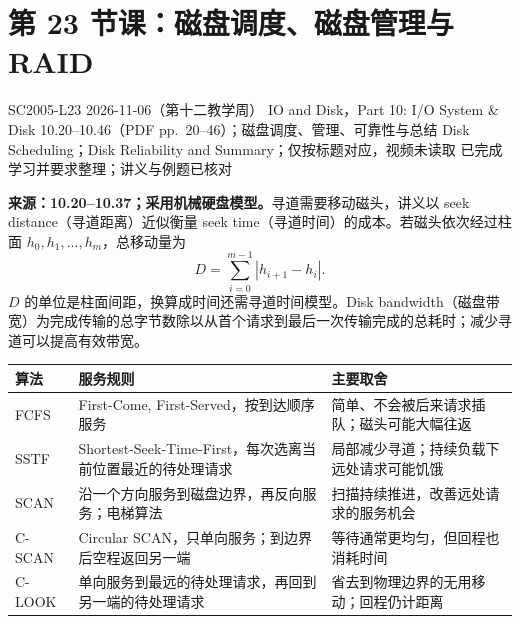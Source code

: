 \begingroup
\renewcommand{\recordid}[1]{}
\renewcommand{\relatedexercise}[2]{\hyperref[exercise:#1]{#2}}
\section{第 23 节课：磁盘调度、磁盘管理与 RAID}
\label{lecture:SC2005-L23}

\lecturemeta
  {SC2005-L23}
  {2026-11-06（第十二教学周）}
  {IO and Disk，Part 10: I/O System \& Disk}
  {10.20--10.46（PDF pp.~20--46）；磁盘调度、管理、可靠性与总结}
  {Disk Scheduling；Disk Reliability and Summary；仅按标题对应，视频未读取}
  {已完成学习并要求整理；讲义与例题已核对}

\linespread{1.1}\selectfont
\setlength{\parskip}{0.3em}



\textbf{来源：10.20--10.37；采用机械硬盘模型。}寻道需要移动磁头，讲义以 seek distance（寻道距离）近似衡量 seek time（寻道时间）的成本。若磁头依次经过柱面 $h_0,h_1,\ldots,h_m$，总移动量为
\[
  D=\sum_{i=0}^{m-1}|h_{i+1}-h_i|.
\]
$D$ 的单位是柱面间距，换算成时间还需寻道时间模型。Disk bandwidth（磁盘带宽）为完成传输的总字节数除以从首个请求到最后一次传输完成的总耗时；减少寻道可以提高有效带宽。

\begin{center}
\small
\begin{tabularx}{\textwidth}{@{}lXX@{}}
\toprule
算法 & 服务规则 & 主要取舍 \\
\midrule
FCFS & First-Come, First-Served，按到达顺序服务 & 简单、不会被后来请求插队；磁头可能大幅往返 \\
SSTF & Shortest-Seek-Time-First，每次选离当前位置最近的待处理请求 & 局部减少寻道；持续负载下远处请求可能饥饿 \\
SCAN & 沿一个方向服务到磁盘边界，再反向服务；电梯算法 & 扫描持续推进，改善远处请求的服务机会 \\
C-SCAN & Circular SCAN，只单向服务；到边界后空程返回另一端 & 等待通常更均匀，但回程也消耗时间 \\
C-LOOK & 单向服务到最远的待处理请求，再回到另一端的待处理请求 & 省去到物理边界的无用移动；回程仍计距离 \\
\bottomrule
\end{tabularx}
\end{center}

